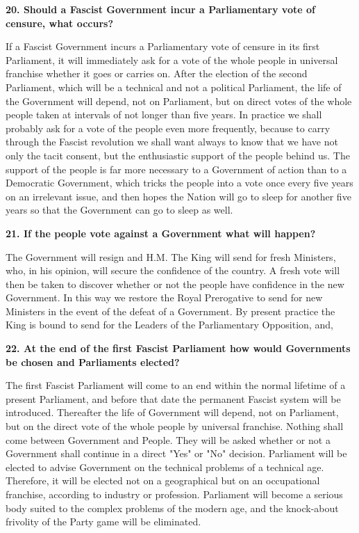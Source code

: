 \documentclass{book}
\begin{document}
\begin{flushleft}
\textbf{20. Should a Fascist Government incur a Parliamentary vote of censure, what occurs?}

If a Fascist Government incurs a Parliamentary vote of censure in its first Parliament, it will
immediately ask for a vote of the whole people in universal franchise whether it goes or carries
on. After the election of the second Parliament, which will be a technical and not a political
Parliament, the life of the Government will depend, not on Parliament, but on direct votes of the
whole people taken at intervals of not longer than five years. In practice we shall probably ask
for a vote of the people even more frequently, because to carry through the Fascist revolution we
shall want always to know that we have not only the tacit consent, but the enthusiastic support of
the people behind us. The support of the people is far more necessary to a Government of action
than to a Democratic Government, which tricks the people into a vote once every five years on
an irrelevant issue, and then hopes the Nation will go to sleep for another five years so that the Government can go to sleep as well.
\end{flushleft}

\begin{flushright}
\textbf{21. If the people vote against a Government what will happen?}

The Government will resign and H.M. The King will send for fresh Ministers, who, in his
opinion, will secure the confidence of the country. A fresh vote will then be taken to discover
whether or not the people have confidence in the new Government. In this way we restore the
Royal Prerogative to send for new Ministers in the event of the defeat of a Government. By
present practice the King is bound to send for the Leaders of the Parliamentary Opposition, and,
\end{flushright}

\begin{flushleft}
\textbf{22. At the end of the first Fascist Parliament how would Governments be chosen and
    Parliaments elected?}

The first Fascist Parliament will come to an end within the normal lifetime of a present
Parliament, and before that date the permanent Fascist system will be introduced. Thereafter the
life of Government will depend, not on Parliament, but on the direct vote of the whole people by
universal franchise. Nothing shall come between Government and People. They will be asked
whether or not a Government shall continue in a direct "Yes" or "No" decision. Parliament will
be elected to advise Government on the technical problems of a technical age. Therefore, it will
be elected not on a geographical but on an occupational franchise, according to industry or
profession. Parliament will become a serious body suited to the complex problems of the modern
age, and the knock-about frivolity of the Party game will be eliminated.
\end{flushleft}
\end{document}
